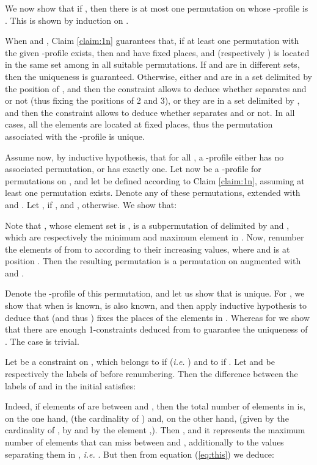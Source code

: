 \documentclass{article}
\begin{document}
We now show that if , then there is at most one permutation on  whose -profile is 
. This is shown by induction on . 

When  and , Claim \ref{claim:1n} guarantees that, if at least one permutation with the
given -profile exists, then  and  have fixed places, and 
 (respectively ) is located in the  same set among   in all suitable permutations.
If  and  are in different sets, then the uniqueness is guaranteed. Otherwise, either  and  are in a set delimited
by the position of , and then the constraint  allows
to deduce whether  separates  and  or not (thus fixing the positions of 2 and 3), 
or they are in a set delimited by , and then the
constraint  allows to deduce whether  separates  and  or not.
In all cases, all the elements are located at fixed places, thus the permutation associated with the
-profile is unique.

Assume now, by inductive hypothesis, that for all ,  a -profile either has no
associated permutation, or has exactly one. Let now  be a -profile for permutations on 
,  and let  be defined according to  Claim \ref{claim:1n}, assuming at least one
permutation exists. Denote  any of these permutations, extended with  and . 
Let , if ,  and , otherwise. We show
that:




Note that , whose element set is ,  is a subpermutation of  delimited by  and ,  
which are respectively the  
minimum and maximum element in . Now, renumber the elements of   from  
to  according to their increasing values, where  and  is at position . 
Then the resulting permutation is a permutation  on  augmented with  and .

Denote   the -profile of this permutation, and let us show  that  is unique.
For , we show that when  is known, 
 is also known, and then apply inductive hypothesis  to deduce that  (and thus ) fixes 
the places of the elements in .   Whereas for  
we show that there are enough 1-constraints deduced from    to guarantee the uniqueness of .
The case  is trivial.

Let  be a constraint on , which belongs to  if 
({\em i.e.} ) and to  if .   Let  and  
be respectively the labels of  before renumbering. Then the difference between the labels
of  and  in the initial  satisfies:



\noindent Indeed, if  elements of  are between  and , then the total number of elements in 
is, on the one hand,  (the cardinality of ) and, on the other hand, 
(given by  the cardinality of , by  and by the element ,). Then , and it represents
the maximum number of elements that can miss between  and , additionally to the values
separating them in , {\em i.e.} . But then from equation (\ref{eq:this}) we deduce: 
\end{document}
